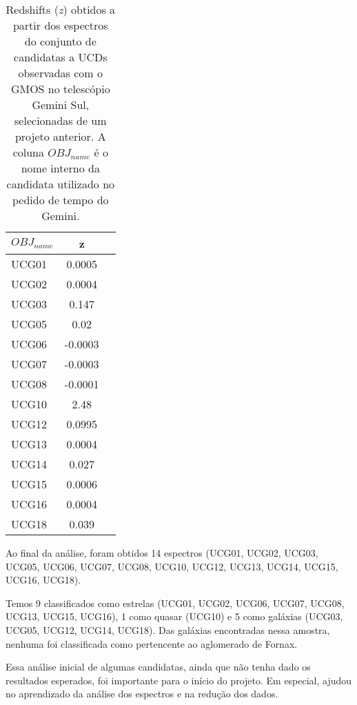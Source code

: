 \begin{table}[!ht]
    \centering
    \caption{Redshifts (\textit{z}) obtidos a partir dos espectros do conjunto de candidatas a UCDs observadas com o GMOS no telescópio Gemini Sul, selecionadas de um projeto anterior. A coluna $OBJ_{name}$ é o nome interno da candidata utilizado no pedido de tempo do Gemini.} 
    \begin{tabular}{lcc}
        \toprule
        $OBJ_{name}$ & z   \\
        \midrule
        UCG01     & 0.0005 \\
        UCG02     & 0.0004 \\
        UCG03     & 0.147 \\
        UCG05     & 0.02 \\
        UCG06     & -0.0003 \\
        UCG07     & -0.0003 \\
        UCG08     & -0.0001 \\
        UCG10     & 2.48 \\
        UCG12     & 0.0995 \\
        UCG13     & 0.0004 \\
        UCG14     & 0.027 \\
        UCG15     & 0.0006 \\
        UCG16     & 0.0004 \\
        UCG18     & 0.039 \\
        \bottomrule
    \end{tabular}
    \label{redshift_candidatas_1}
\end{table}


Ao final da análise, foram obtidos 14 espectros (UCG01, UCG02, UCG03, UCG05, UCG06, UCG07, UCG08, UCG10, UCG12, UCG13, UCG14, UCG15, UCG16, UCG18).

Temos 9 classificados como estrelas (UCG01, UCG02, UCG06, UCG07, UCG08, UCG13, UCG15, UCG16), 1 como quasar (UCG10) e 5 como galáxias (UCG03, UCG05, UCG12, UCG14, UCG18). Das galáxias encontradas nessa amostra, nenhuma foi classificada como pertencente ao aglomerado de Fornax.

Essa análise inicial de algumas candidatas, ainda que não tenha dado os resultados esperados, foi importante para o início do projeto. Em especial, ajudou no aprendizado da análise dos espectros e na redução dos dados.






